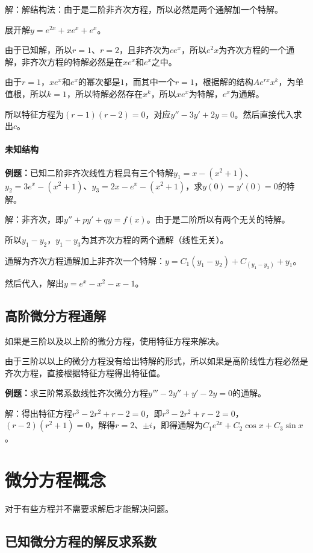 \documentclass[UTF8, 12pt]{ctexart}
\begin{document}
解：解结构法：由于是二阶非齐次方程，所以必然是两个通解加一个特解。

展开解$y=e^{2x}+xe^x+e^x$。

由于已知解，所以$r=1$、$r=2$，且非齐次为$ce^x$，所以$e^2x$为齐次方程的一个通解，非齐次方程的特解必然是在$xe^x$和$e^x$之中。

由于$r=1$，$xe^x$和$e^x$的幂次都是$1$，而其中一个$r=1$，根据解的结构$Ae^{rx}x^k$，为单值根，所以$k=1$，所以特解必然存在$x^k$，所以$xe^x$为特解，$e^x$为通解。

所以特征方程为$(r-1)(r-2)=0$，对应$y''-3y'+2y=0$。然后直接代入求出$c$。

\paragraph{未知结构} \leavevmode \medskip

\textbf{例题：}已知二阶非齐次线性方程具有三个特解$y_1=x-(x^2+1)$、$y_2=3e^x-(x^2+1)$、$y_3=2x-e^x-(x^2+1)$，求$y(0)=y'(0)=0$的特解。

解：非齐次，即$y''+py'+qy=f(x)$。由于是二阶所以有两个无关的特解。

所以$y_1-y_2$，$y_1-y_3$为其齐次方程的两个通解（线性无关）。

通解为齐次方程通解加上非齐次一个特解：$y=C_1(y_1-y_2)+C_(y_1-y_3)+y_1$。

然后代入，解出$y=e^x-x^2-x-1$。

\subsection{高阶微分方程通解}

如果是三阶以及以上阶的微分方程，使用特征方程来解决。

由于三阶以以上的微分方程没有给出特解的形式，所以如果是高阶线性方程必然是齐次方程，直接根据特征方程得出特征值。

\textbf{例题：}求三阶常系数线性齐次微分方程$y'''-2y''+y'-2y=0$的通解。

解：得出特征方程$r^3-2r^2+r-2=0$，即$r^3-2r^2+r-2=0$，$(r-2)(r^2+1)=0$，解得$r=2$、$\pm i$，即得通解为$C_1e^{2x}+C_2\cos x+C_3\sin x$。

\section{微分方程概念}

对于有些方程并不需要求解后才能解决问题。

\subsection{已知微分方程的解反求系数}
\end{document}
